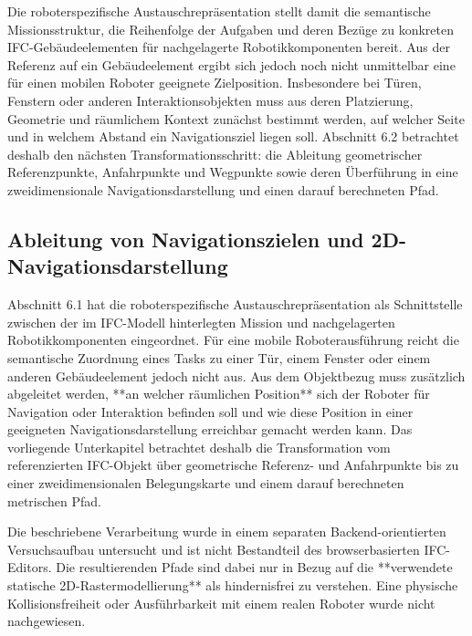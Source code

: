 Die roboterspezifische Austauschrepräsentation stellt damit die semantische Missionsstruktur, die
Reihenfolge der Aufgaben und deren Bezüge zu konkreten IFC-Gebäudeelementen für nachgelagerte
Robotikkomponenten bereit. Aus der Referenz auf ein Gebäudeelement ergibt sich jedoch noch nicht
unmittelbar eine für einen mobilen Roboter geeignete Zielposition. Insbesondere bei Türen, Fenstern
oder anderen Interaktionsobjekten muss aus deren Platzierung, Geometrie und räumlichem Kontext
zunächst bestimmt werden, auf welcher Seite und in welchem Abstand ein Navigationsziel liegen soll.
Abschnitt 6.2 betrachtet deshalb den nächsten Transformationsschritt: die Ableitung geometrischer
Referenzpunkte, Anfahrpunkte und Wegpunkte sowie deren Überführung in eine zweidimensionale
Navigationsdarstellung und einen darauf berechneten Pfad.

\subsection{Ableitung von Navigationszielen und 2D-Navigationsdarstellung}
Abschnitt 6.1 hat die roboterspezifische Austauschrepräsentation als Schnittstelle zwischen der im
IFC-Modell hinterlegten Mission und nachgelagerten Robotikkomponenten eingeordnet. Für eine mobile
Roboterausführung reicht die semantische Zuordnung eines Tasks zu einer Tür, einem Fenster oder
einem anderen Gebäudeelement jedoch nicht aus. Aus dem Objektbezug muss zusätzlich abgeleitet
werden, **an welcher räumlichen Position** sich der Roboter für Navigation oder Interaktion befinden
soll und wie diese Position in einer geeigneten Navigationsdarstellung erreichbar gemacht werden
kann. Das vorliegende Unterkapitel betrachtet deshalb die Transformation vom referenzierten
IFC-Objekt über geometrische Referenz- und Anfahrpunkte bis zu einer zweidimensionalen
Belegungskarte und einem darauf berechneten metrischen Pfad.

Die beschriebene Verarbeitung wurde in einem separaten Backend-orientierten Versuchsaufbau
untersucht und ist nicht Bestandteil des browserbasierten IFC-Editors. Die resultierenden Pfade sind
dabei nur in Bezug auf die **verwendete statische 2D-Rastermodellierung** als hindernisfrei zu
verstehen. Eine physische Kollisionsfreiheit oder Ausführbarkeit mit einem realen Roboter wurde
nicht nachgewiesen.
